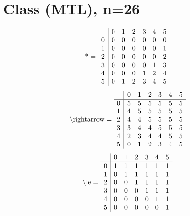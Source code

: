 \documentclass[11pt]{article}
\begin{document}
\section{Class (MTL), n=26}
\[\text{*} = 
\begin{array}{r | r r r r r r}
 & 0 & 1 & 2 & 3 & 4 & 5 \\ \hline
0 & 0 & 0 & 0 & 0 & 0 & 0 \\
1 & 0 & 0 & 0 & 0 & 0 & 1 \\
2 & 0 & 0 & 0 & 0 & 0 & 2 \\
3 & 0 & 0 & 0 & 0 & 1 & 3 \\
4 & 0 & 0 & 0 & 1 & 2 & 4 \\
5 & 0 & 1 & 2 & 3 & 4 & 5 \\
\end{array}
\]
\[\text{\textbackslash rightarrow} = 
\begin{array}{r | r r r r r r}
 & 0 & 1 & 2 & 3 & 4 & 5 \\ \hline
0 & 5 & 5 & 5 & 5 & 5 & 5 \\
1 & 4 & 5 & 5 & 5 & 5 & 5 \\
2 & 4 & 4 & 5 & 5 & 5 & 5 \\
3 & 3 & 4 & 4 & 5 & 5 & 5 \\
4 & 2 & 3 & 4 & 4 & 5 & 5 \\
5 & 0 & 1 & 2 & 3 & 4 & 5 \\
\end{array}
\]
\[\text{\textbackslash le} = 
\begin{array}{r | r r r r r r}
 & 0 & 1 & 2 & 3 & 4 & 5 \\ \hline
0 & 1 & 1 & 1 & 1 & 1 & 1 \\
1 & 0 & 1 & 1 & 1 & 1 & 1 \\
2 & 0 & 0 & 1 & 1 & 1 & 1 \\
3 & 0 & 0 & 0 & 1 & 1 & 1 \\
4 & 0 & 0 & 0 & 0 & 1 & 1 \\
5 & 0 & 0 & 0 & 0 & 0 & 1 \\
\end{array}
\]
\end{document}
